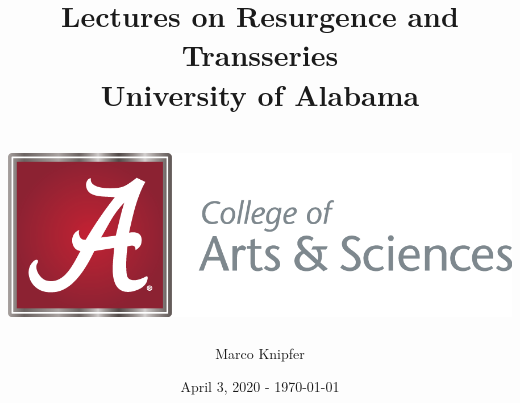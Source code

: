 \documentclass[12pt]{report}
\title{%
{Lectures on Resurgence and Transseries}\\
{\large University of Alabama}\\~\\
{\includegraphics{figures/UA-ArtsSciences.png}}
}
\author{Marco Knipfer}
\date{April 3, 2020 - \today}
\begin{document}
\begin{titlepage}
    \maketitle
\end{titlepage}


\tableofcontents


 
\end{document}
